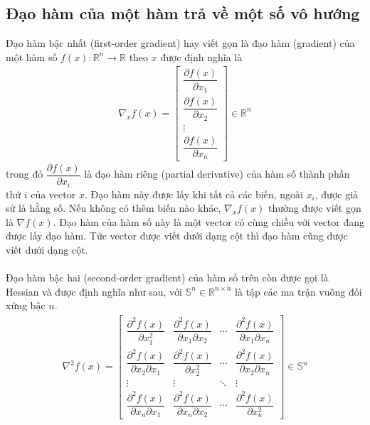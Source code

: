 \documentclass[12pt,a4paper]{report}
\begin{document}
	\subsection{Đạo hàm của một hàm trả về một số vô hướng}
	Đạo hàm bậc nhất (first-order gradient) hay viết gọn là đạo hàm (gradient) của một hàm số $f(x): \mathbb{R}^n \rightarrow \mathbb{R}$ theo $x$ được định nghĩa là
	\begin{eqnarray}
		\nabla_xf(x) = \begin{bmatrix}
			\dfrac{\partial f(x)}{\partial x_1}\\\dfrac{\partial f(x)}{\partial x_2}\\ \vdots \\ \dfrac{\partial f(x)}{\partial x_n}
		\end{bmatrix} \in \mathbb{R}^n
	\end{eqnarray} trong đó $\dfrac{\partial f(x)}{\partial x_i}$ là đạo hàm riêng (partial derivative) của hàm số thành phần thứ $i$ của vector $x$. Đạo hàm này được lấy khi tất cả các biến, ngoài $x_i$, được giả sử là hằng số. Nếu không có thêm biến nào khác, $\nabla_xf(x)$ thường được viết gọn là $\nabla f(x)$. Đạo hàm của hàm số này là một vector có cùng chiều với vector đang được lấy đạo hàm. Tức vector được viết dưới dạng cột thì đạo hàm cũng được viết dưới dạng cột. \\\\ Đạo hàm bậc hai (second-order gradient) của hàm số trên còn được gọi là Hessian và được định nghĩa như sau, với $\mathbb{S}^n \in \mathbb{R}^{n \times n}$ là tập các ma trận vuông đối xứng bậc $n$.
	\begin{eqnarray}
		\nabla^2f(x) = \begin{bmatrix}
			\dfrac{\partial^2 f(x)}{\partial x^2_1}&\dfrac{\partial^2 f(x)}{\partial x_1\partial x_2}&\cdots&\dfrac{\partial^2 f(x)}{\partial x_1\partial x_n} \\ 	\dfrac{\partial^2 f(x)}{\partial x_2 \partial x_1}&\dfrac{\partial^2 f(x)}{\partial x^2_2}&\cdots&\dfrac{\partial^2 f(x)}{\partial x_2\partial x_n} \\ \vdots & \vdots& \ddots& \vdots \\ 	\dfrac{\partial^2 f(x)}{\partial x_n \partial x_1}&\dfrac{\partial^2 f(x)}{\partial x_n\partial x_2}&\cdots&\dfrac{\partial^2 f(x)}{\partial x^2_n}
		\end{bmatrix} \in \mathbb{S}^n
	\end{eqnarray}
\end{document}
